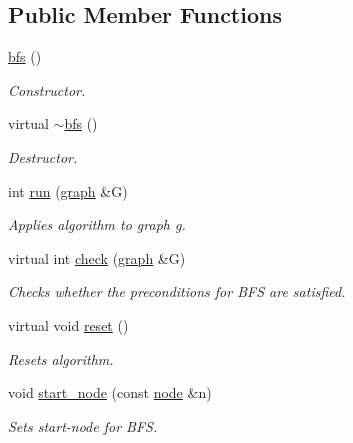 \subsection*{Public Member Functions}
\begin{DoxyCompactItemize}
\item 
\mbox{\label{classbfs_a16543f987ad29303e7d13650d5463605}} 
\mbox{\hyperlink{classbfs_a16543f987ad29303e7d13650d5463605}{bfs}} ()
\begin{DoxyCompactList}\small\item\em Constructor. \end{DoxyCompactList}\item 
\mbox{\label{classbfs_a6999a08f3cee2b54f07ffeac0d484df1}} 
virtual \mbox{\hyperlink{classbfs_a6999a08f3cee2b54f07ffeac0d484df1}{$\sim$bfs}} ()
\begin{DoxyCompactList}\small\item\em Destructor. \end{DoxyCompactList}\item 
int \mbox{\hyperlink{classbfs_a06ae16bd0f3bb2f8eb6b3e36659ba82e}{run}} (\mbox{\hyperlink{classgraph}{graph}} \&G)
\begin{DoxyCompactList}\small\item\em Applies algorithm to graph g. \end{DoxyCompactList}\item 
virtual int \mbox{\hyperlink{classbfs_a6dd7e852f7768814aafba8962befca56}{check}} (\mbox{\hyperlink{classgraph}{graph}} \&G)
\begin{DoxyCompactList}\small\item\em Checks whether the preconditions for B\+FS are satisfied. \end{DoxyCompactList}\item 
virtual void \mbox{\hyperlink{classbfs_a6398bc230f9723cd5fdd32cd603647cc}{reset}} ()
\begin{DoxyCompactList}\small\item\em Resets algorithm. \end{DoxyCompactList}\item 
void \mbox{\hyperlink{classbfs_a23e2981c2ee617a6e12a8833d2db6210}{start\+\_\+node}} (const \mbox{\hyperlink{classnode}{node}} \&n)
\begin{DoxyCompactList}\small\item\em Sets start-\/node for B\+FS. \end{DoxyCompactList}\item 

\end{DoxyCompactItemize}
